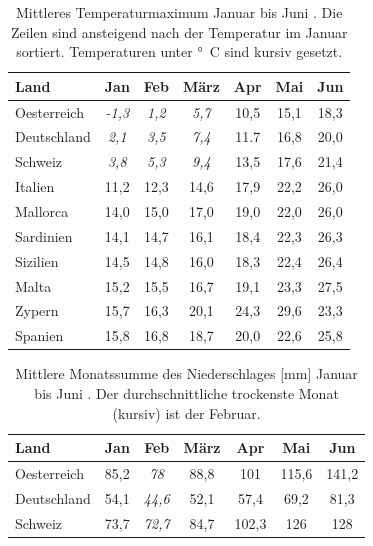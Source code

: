 \documentclass[a4paper,DIV13,BCOR0cm,draft=TRUE]{scrartcl}
\begin{document}
\begin{table}
        \centering
        \begin{tabular}{lcccccc}
                \toprule
                 Land & Jan & Feb & März & Apr & Mai & Jun \\
                 \midrule
                 Oesterreich     & \textit{-1,3} & \textit{1,2} & \textit{5,7} & 10,5 & 15,1 & 18,3 \\
                 Deutschland    & \textit{2,1} & \textit{3,5} & \textit{7,4} & 11.7 & 16,8 & 20,0 \\
                 Schweiz        & \textit{3,8} & \textit{5,3} & \textit{9,4} & 13,5 & 17,6 & 21,4 \\
                 Italien        & 11,2 & 12,3 & 14,6 & 17,9 & 22,2 & 26,0 \\
                Mallorca        & 14,0 & 15,0 & 17,0 & 19,0 & 22,0 & 26,0 \\
                Sardinien   & 14,1 & 14,7 & 16,1 & 18,4 & 22,3 & 26,3 \\
                Sizilien    & 14,5 & 14,8 & 16,0 & 18,3 & 22,4 & 26,4 \\
                Malta       & 15,2 & 15,5 & 16,7 & 19,1 & 23,3 & 27,5 \\
                 Zypern         & 15,7 & 16,3 & 20,1 & 24,3 & 29,6 & 23,3\\
                 Spanien        & 15,8 & 16,8 & 18,7 & 20,0 & 22,6 & 25,8 \\
                 \bottomrule
        \end{tabular}
        \caption{
            Mittleres Temperaturmaximum Januar bis Juni \protect\cite{rtl2015klima}.
            Die Zeilen sind ansteigend nach der Temperatur im Januar sortiert.
            Temperaturen unter \protect\unit[10]{\degree C} sind kursiv gesetzt.
            }
        \label{tab:tempmax}
\end{table}


\begin{table}
        \centering
        \begin{tabular}{lcccccc}
                \toprule
                 Land & Jan & Feb & März & Apr & Mai & Jun \\
                 \midrule
                 Oesterreich     & 85,2 & \textit{78} & 88,8 & 101 & 115,6 & 141,2 \\
                 Deutschland    & 54,1 & \textit{44,6} & 52,1 & 57,4 & 69,2 & 81,3 \\
                 Schweiz        & 73,7 & \textit{72,7} & 84,7 & 102,3 & 126 & 128 \\
                 \bottomrule
        \end{tabular}
        \caption{
                Mittlere Monatssumme des Niederschlages [mm] Januar bis Juni \protect\cite{rtl2015klima}.
                Der durchschnittliche trockenste Monat (kursiv) ist der Februar.
            }
        \label{tab:niederschlag}
\end{table}
\end{document}
